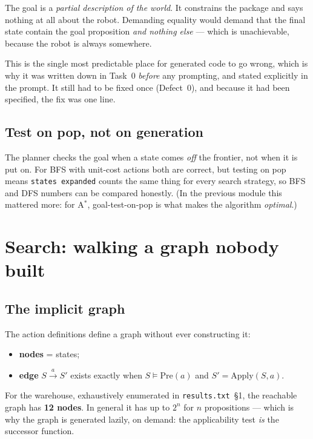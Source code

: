 \documentclass[11pt,a4paper]{article}
\newcommand{\ent}{\models}
\begin{document}
The goal is a \emph{partial description of the world}. It constrains the package
and says nothing at all about the robot. Demanding equality would demand that
the final state contain the goal proposition \emph{and nothing else} --- which
is unachievable, because the robot is always somewhere.

This is the single most predictable place for generated code to go wrong, which
is why it was written down in Task~0 \emph{before} any prompting, and stated
explicitly in the prompt. It still had to be fixed once (Defect~0), and because
it had been specified, the fix was one line.

\subsection{Test on pop, not on generation}

The planner checks the goal when a state comes \emph{off} the frontier, not
when it is put on. For BFS with unit-cost actions both are correct, but testing
on pop means \texttt{states expanded} counts the same thing for every search
strategy, so BFS and DFS numbers can be compared honestly. (In the previous
module this mattered more: for A$^\ast$, goal-test-on-pop is what makes the
algorithm \emph{optimal}.)

\section{Search: walking a graph nobody built}

\subsection{The implicit graph}

The action definitions define a graph without ever constructing it:
\begin{itemize}
  \item \textbf{nodes} = states;
  \item \textbf{edge} $S \xrightarrow{\;a\;} S'$ exists exactly when
        $S \ent \mathrm{Pre}(a)$ and $S' = \mathrm{Apply}(S,a)$.
\end{itemize}

For the warehouse, exhaustively enumerated in \texttt{results.txt}~\S1, the
reachable graph has \textbf{12 nodes}. In general it has up to $2^{n}$ for $n$
propositions --- which is why the graph is generated lazily, on demand: the
applicability test \emph{is} the successor function.
\end{document}
